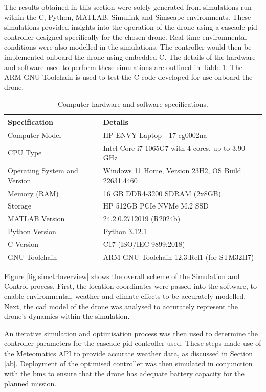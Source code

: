 The results obtained in this section were solely generated from simulations run within the C, Python, MATLAB, Simulink and Simscape environments. These simulations provided insights into the operation of the drone using a cascade \gls{pid} controller designed specifically for the chosen drone.  Real-time environmental conditions were also modelled in the simulations. The controller would then be implemented onboard the drone using embedded C. The details of the hardware and software used to perform these simulations are outlined in Table \ref{tab:computersetup}. The ARM GNU Toolchain is used to test the C code developed for use onboard the drone.  
\begin{table}[h]
\begin{center}
\begin{tabular}{| p{6cm}|p{10cm}|}
 \hline
 \textbf{Specification}       & Details\\ 
 \hline
 Computer Model                & HP ENVY Laptop - 17-cg0002na          \\ 
 CPU Type                     & Intel Core i7-1065G7 with 4 cores, up to 3.90 GHz \\ 
 Operating System and Version & Windows 11 Home, Version 23H2, OS Build 22631.4460 \\ 
 Memory (RAM)                 & 16 GB DDR4-3200 SDRAM (2x8GB)      \\  
 Storage                      & HP 512GB PCIe NVMe M.2 SSD            \\ 
 MATLAB Version               & 24.2.0.2712019 (R2024b) \\ 
  Python Version& Python 3.12.1\\
 C Version&C17 (ISO/IEC 9899:2018)\\ 
 GNU Toolchain& ARM GNU Toolchain 12.3.Rel1 (for STM32H7)\\ 
 \hline
\end{tabular}
\end{center}
\caption{Computer hardware and software specifications.}
\label{tab:computersetup}
\end{table}

Figure \ref{fig:simctrloverview} shows the overall scheme of the Simulation and Control process. First, the location coordinates were passed into the software, to enable environmental, weather and climate effects to be accurately modelled. Next, the \gls{cad} model of the drone was analysed to accurately represent the drone's dynamics within the simulation.

An iterative simulation and optimisation process was then used to determine the controller parameters for the cascade \gls{pid} controller used. These steps made use of the Meteomatics API to provide accurate weather data, as discussed in Section \ref{ab}. Deployment of the optimised controller was then simulated in conjunction with the \gls{bms} to ensure that the drone has adequate battery capacity for the planned mission. 


